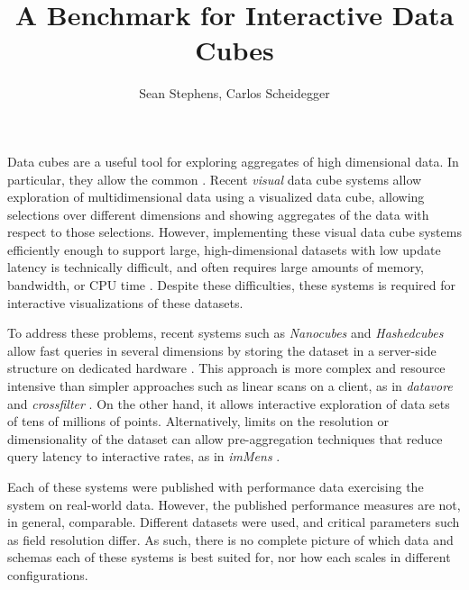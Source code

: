 \documentclass[journal]{vgtc}                %
\title{A Benchmark for Interactive Data Cubes}
\author{Sean Stephens, Carlos Scheidegger}
\begin{document}


\maketitle

Data cubes are a useful tool for exploring aggregates of high dimensional data.
In particular, they allow the common \cite{2007-data-cube}.  Recent \textit{visual} data cube
systems allow exploration of multidimensional data using a visualized data
cube, allowing selections over different dimensions and showing aggregates of
the data with respect to those selections. However, implementing these visual
data cube systems efficiently enough to support large, high-dimensional
datasets with low update latency is technically difficult, and often requires large amounts of memory, bandwidth, or CPU time \cite{???}. Despite these difficulties, 
these systems is required for interactive visualizations of these datasets.

To address these problems, recent systems such as \textit{Nanocubes} and
\textit{Hashedcubes} allow fast queries in several dimensions by storing the
dataset in a server-side structure on dedicated hardware
\cite{2013-nanocubes,hashedcube}. This approach is more complex and
resource intensive than simpler approaches such as linear scans on a client,
as in \textit{datavore} and \textit{crossfilter} \cite{datavore,crossfilter}.
On the other hand, it allows interactive exploration of data sets of tens of
millions of points. Alternatively, limits on the resolution or dimensionality of the dataset can allow pre-aggregation techniques that reduce query latency to interactive rates, as in \textit{imMens} \cite{2013-immens}. 

Each of these systems were published with performance data exercising
the system on real-world data. However, the published performance measures
are not, in general, comparable. Different datasets were used, and critical
parameters such as field resolution differ. As such, there is no complete
picture of which data and schemas each of these systems is best suited for,
nor how each scales in different configurations.
\end{document}
